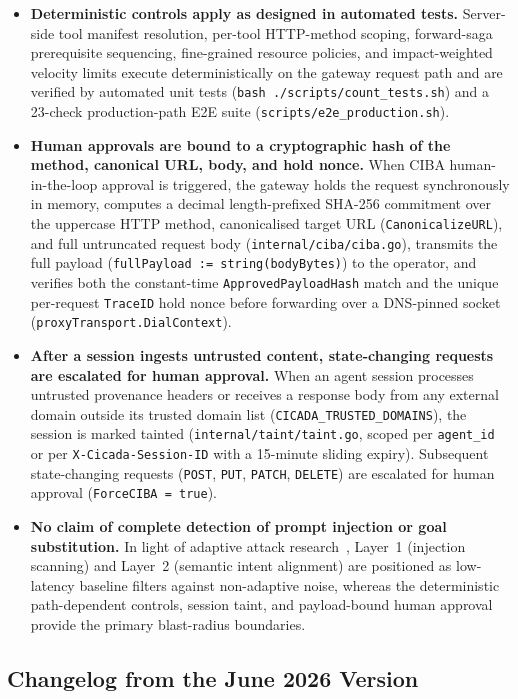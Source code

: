 \documentclass[11pt, a4paper]{article}
\begin{document}
\begin{itemize}[leftmargin=2em]
    \item \textbf{Deterministic controls apply as designed in automated tests.} Server-side tool manifest resolution, per-tool HTTP-method scoping, forward-saga prerequisite sequencing, fine-grained resource policies, and impact-weighted velocity limits execute deterministically on the gateway request path and are verified by automated unit tests (\texttt{bash ./scripts/count\_tests.sh}) and a 23-check production-path E2E suite (\texttt{scripts/e2e\_production.sh}).
    \item \textbf{Human approvals are bound to a cryptographic hash of the method, canonical URL, body, and hold nonce.} When CIBA human-in-the-loop approval is triggered, the gateway holds the request synchronously in memory, computes a decimal length-prefixed SHA-256 commitment over the uppercase HTTP method, canonicalised target URL (\texttt{CanonicalizeURL}), and full untruncated request body (\texttt{internal/ciba/ciba.go}), transmits the full payload (\texttt{fullPayload := string(bodyBytes)}) to the operator, and verifies both the constant-time \texttt{ApprovedPayloadHash} match and the unique per-request \texttt{TraceID} hold nonce before forwarding over a DNS-pinned socket (\texttt{proxyTransport.DialContext}).
    \item \textbf{After a session ingests untrusted content, state-changing requests are escalated for human approval.} When an agent session processes untrusted provenance headers or receives a response body from any external domain outside its trusted domain list (\texttt{CICADA\_TRUSTED\_DOMAINS}), the session is marked tainted (\texttt{internal/taint/taint.go}, scoped per \texttt{agent\_id} or per \texttt{X-Cicada-Session-ID} with a 15-minute sliding expiry). Subsequent state-changing requests (\texttt{POST}, \texttt{PUT}, \texttt{PATCH}, \texttt{DELETE}) are escalated for human approval (\texttt{ForceCIBA = true}).
    \item \textbf{No claim of complete detection of prompt injection or goal substitution.} In light of adaptive attack research~\cite{nasr2025}, Layer~1 (injection scanning) and Layer~2 (semantic intent alignment) are positioned as low-latency baseline filters against non-adaptive noise, whereas the deterministic path-dependent controls, session taint, and payload-bound human approval provide the primary blast-radius boundaries.
\end{itemize}

\subsection{Changelog from the June 2026 Version}
\label{subsec:changelog}
\end{document}
